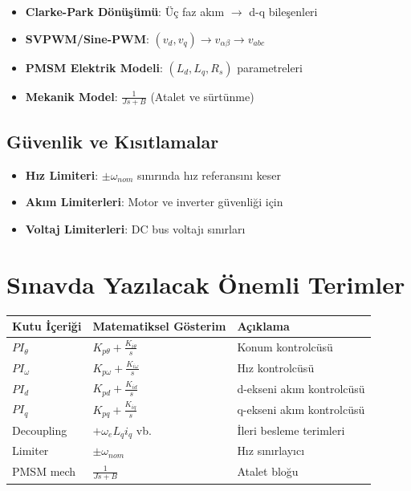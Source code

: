 \documentclass[12pt,a4paper]{article}
\begin{document}
\begin{itemize}
    \item \textbf{Clarke-Park Dönüşümü}: Üç faz akım $\rightarrow$ d-q bileşenleri
    \item \textbf{SVPWM/Sine-PWM}: $(v_d, v_q) \rightarrow v_{\alpha\beta} \rightarrow v_{abc}$
    \item \textbf{PMSM Elektrik Modeli}: $(L_d, L_q, R_s)$ parametreleri
    \item \textbf{Mekanik Model}: $\frac{1}{Js + B}$ (Atalet ve sürtünme)
\end{itemize}

\subsection*{Güvenlik ve Kısıtlamalar}

\begin{itemize}
    \item \textbf{Hız Limiteri}: $\pm\omega_{nom}$ sınırında hız referansını keser
    \item \textbf{Akım Limiterleri}: Motor ve inverter güvenliği için
    \item \textbf{Voltaj Limiterleri}: DC bus voltajı sınırları
\end{itemize}

\section*{Sınavda Yazılacak Önemli Terimler}

\begin{center}
\begin{tabular}{|l|l|l|}
\hline
\textbf{Kutu İçeriği} & \textbf{Matematiksel Gösterim} & \textbf{Açıklama} \\
\hline
$PI_\theta$ & $K_{p\theta} + \frac{K_{i\theta}}{s}$ & Konum kontrolcüsü \\
$PI_\omega$ & $K_{p\omega} + \frac{K_{i\omega}}{s}$ & Hız kontrolcüsü \\
$PI_d$ & $K_{pd} + \frac{K_{id}}{s}$ & d-ekseni akım kontrolcüsü \\
$PI_q$ & $K_{pq} + \frac{K_{iq}}{s}$ & q-ekseni akım kontrolcüsü \\
Decoupling & $+\omega_e L_q i_q$ vb. & İleri besleme terimleri \\
Limiter & $\pm\omega_{nom}$ & Hız sınırlayıcı \\
PMSM mech & $\frac{1}{Js + B}$ & Atalet bloğu \\
\hline
\end{tabular}
\end{center}
\end{document}

